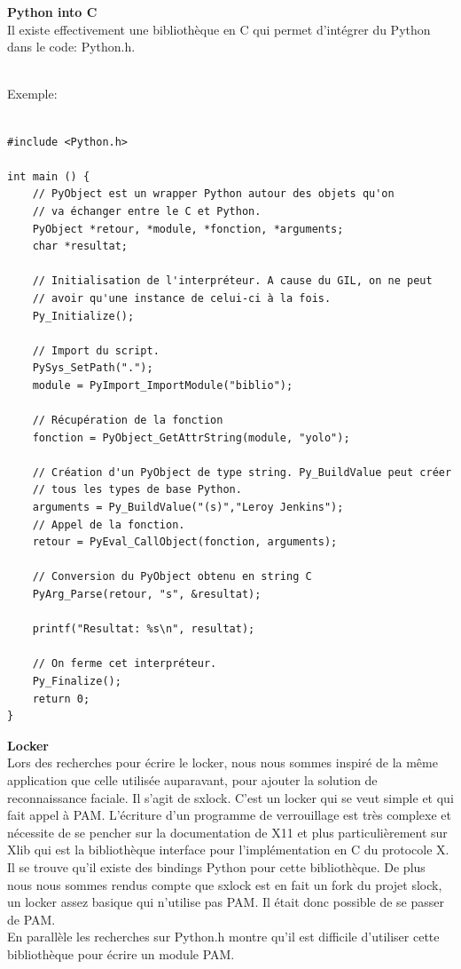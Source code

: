\documentclass[french]{report}
\begin{document}
  \vspace{0.5cm}

  \textbf{Python into C}\\

  Il existe effectivement une bibliothèque en C qui permet d’intégrer du
  Python dans le code: Python.h.
\\ \\

\newpage

  Exemple:

  \begin{verbatim}

#include <Python.h>

int main () {
    // PyObject est un wrapper Python autour des objets qu'on
    // va échanger entre le C et Python.
    PyObject *retour, *module, *fonction, *arguments;
    char *resultat;

    // Initialisation de l'interpréteur. A cause du GIL, on ne peut
    // avoir qu'une instance de celui-ci à la fois.
    Py_Initialize();

    // Import du script.
    PySys_SetPath(".");
    module = PyImport_ImportModule("biblio");

    // Récupération de la fonction
    fonction = PyObject_GetAttrString(module, "yolo");

    // Création d'un PyObject de type string. Py_BuildValue peut créer
    // tous les types de base Python.
    arguments = Py_BuildValue("(s)","Leroy Jenkins");
    // Appel de la fonction.
    retour = PyEval_CallObject(fonction, arguments);

    // Conversion du PyObject obtenu en string C
    PyArg_Parse(retour, "s", &resultat);

    printf("Resultat: %s\n", resultat);

    // On ferme cet interpréteur.
    Py_Finalize();
    return 0;
}
  \end{verbatim}

  \vspace{0.5cm}

  \textbf{Locker}\\

  Lors des recherches pour écrire le locker, nous nous sommes inspiré de la même
  application que celle utilisée auparavant, pour ajouter la solution de
  reconnaissance faciale. Il s’agit de sxlock. C’est un locker qui se
  veut simple et qui fait appel à PAM. L’écriture d’un programme de
  verrouillage est très complexe et nécessite de se pencher sur la
  documentation de X11 et plus particulièrement sur Xlib qui est la
  bibliothèque interface pour l’implémentation en C du protocole X. Il se
  trouve qu’il existe des bindings Python pour cette bibliothèque. De plus nous
  nous sommes rendus compte que sxlock est en fait un fork du projet slock, un
  locker assez basique qui n’utilise pas PAM. Il était donc possible de se passer de PAM.
\\
  En parallèle les recherches sur Python.h montre qu’il est difficile
  d’utiliser cette bibliothèque pour écrire un module PAM.
\end{document}
